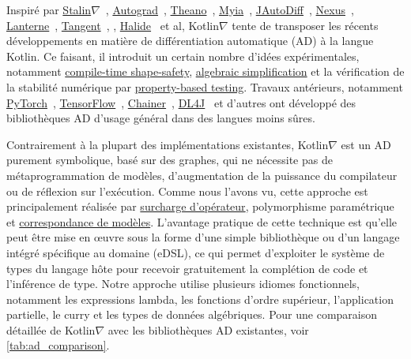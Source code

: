Inspiré par \href{https://github.com/Functional-AutoDiff/STALINGRAD}{Stalin$\nabla$}~\citep{pearlmutter2008using}, \href{https://github.com/HIPS/autograd/}{Autograd}~\citep{maclaurin2015autograd, maclaurin2016phd}, \href{http://deeplearning. net/software/theano/}{Theano}~\citep{bergstra2010theano}, \href{https://github.com/mila-iqia/myia}{Myia}~\citep{breuleux2017automatic, vanmerrienboer2018ad}, \href{https://github. com/uniker9/JAutoDiff/}{JAutoDiff}~\citep{nureki2012jautodiff}, \href{https://tongfei.me/nexus/}{Nexus}~\citep{chen2017typesafe}, \href{https://feiwang3311.github.io/Lantern/}{Lanterne}~\citep{wang2018demystifying}, \href{https://github. com/google/tangent}{Tangent}~\citep{van2018tangent}, \citet{elliott2018simple}, \href{https://people.csail.mit.edu/tzumao/gradient_halide/}{Halide}~\citep{li2018halide} et al, Kotlin$\nabla$ tente de transposer les récents développements en matière de différentiation automatique (AD) à la langue Kotlin. Ce faisant, il introduit un certain nombre d'idées expérimentales, notamment \hyperref[sec:shape-safety]{compile-time shape-safety}, \hyperref[sec:multiple-dispatch]{algebraic simplification} et la vérification de la stabilité numérique par \hyperref[sec:testing]{property-based testing}. Travaux antérieurs, notamment \href{https://pytorch.org/}{PyTorch}~\citep{paszke2019pytorch}, \href{https://www.tensorflow.org/}{TensorFlow}~\citep{abadi2016tensorflow}, \href{https://chainer. org/}{Chainer}~\citep{chainer}, \href{https://deeplearning4j.org/}{DL4J}~\cite{team2016dl4j} et d'autres ont développé des bibliothèques AD d'usage général dans des langues moins sûres.

Contrairement à la plupart des implémentations existantes, Kotlin$\nabla$ est un AD purement symbolique, basé sur des graphes, qui ne nécessite pas de métaprogrammation de modèles, d'augmentation de la puissance du compilateur ou de réflexion sur l'exécution. Comme nous l'avons vu, cette approche est principalement réalisée par \hyperref[sec:operator-overloading]{surcharge d'opérateur}, polymorphisme paramétrique et \hyperref[sec:adts]{correspondance de modèles}. L'avantage pratique de cette technique est qu'elle peut être mise en œuvre sous la forme d'une simple bibliothèque ou d'un langage intégré spécifique au domaine (eDSL), ce qui permet d'exploiter le système de types du langage hôte pour recevoir gratuitement la complétion de code et l'inférence de type. Notre approche utilise plusieurs idiomes fonctionnels, notamment les expressions lambda, les fonctions d'ordre supérieur, l'application partielle, le curry et les types de données algébriques. Pour une comparaison détaillée de Kotlin$\nabla$ avec les bibliothèques AD existantes, voir \autoref{tab:ad_comparison}.\\

